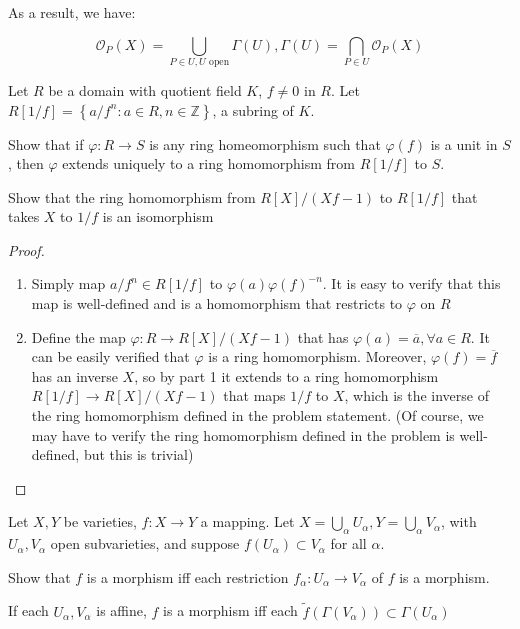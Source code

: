 \documentclass{solution}
\begin{document}
As a result, we have:

$$\mathcal{O}_{P}(X) = \bigcup\limits_{P \in U, U \text{ open}} \Gamma(U), \Gamma(U) = \bigcap\limits_{P \in U} \mathcal{O}_{P}(X)$$

\begin{problem}{6.13}
    Let $R$ be a domain with quotient field $K$, $f \ne 0$ in $R$. Let $R[1 / f] = \left\lbrace a / f^n: a \in R, n \in \mathbb{Z} \right\rbrace$, a subring of $K$. \begin{inparaenum}
        \item Show that if $\varphi: R \rightarrow S$ is any ring homeomorphism such that $\varphi(f)$ is a unit in $S$, then $\varphi$ extends uniquely to a ring homomorphism from $R[1 / f]$ to $S$.
        \item Show that the ring homomorphism from $R[X] / (Xf - 1)$ to $R[1 / f]$ that takes $X$ to $1/f$ is an isomorphism
    \end{inparaenum}
\end{problem}

\begin{proof}
    \begin{enumerate}
        \item Simply map $a / f^n \in R[1 / f]$ to $\varphi(a) \varphi(f)^{-n}$. It is easy to verify that this map is well-defined and is a homomorphism that restricts to $\varphi$ on $R$
        \item Define the map $\varphi: R \rightarrow R[X] / (Xf - 1)$ that has $\varphi(a) = \overline{a}, \forall a \in R$. It can be easily verified that $\varphi$ is a ring homomorphism. Moreover, $\varphi(f) = \overline{f}$ has an inverse $X$, so by part 1 it extends to a ring homomorphism $R[1 / f] \rightarrow R[X] / (Xf - 1)$ that maps $1 / f$ to $X$, which is the inverse of the ring homomorphism defined in the problem statement. (Of course, we may have to verify the ring homomorphism defined in the problem is well-defined, but this is trivial)
    \end{enumerate}
\end{proof}

\begin{problem}{6.14}
    Let $X, Y$ be varieties, $f: X \rightarrow Y$ a mapping. Let $X = \bigcup\limits_{\alpha} U_{\alpha}, Y = \bigcup\limits_{\alpha} V_{\alpha}$, with $U_{\alpha}, V_{\alpha}$ open subvarieties, and suppose $f(U_{\alpha}) \subset V_{\alpha}$ for all $\alpha$. \begin{inparaenum}
        \item Show that $f$ is a morphism iff each restriction $f_\alpha: U_\alpha \rightarrow V_\alpha$ of $f$ is a morphism.
        \item If each $U_\alpha, V_\alpha$ is affine, $f$ is a morphism iff each $\tilde{f}(\Gamma(V_\alpha)) \subset \Gamma(U_\alpha)$
    \end{inparaenum}
\end{problem}
\end{document}
